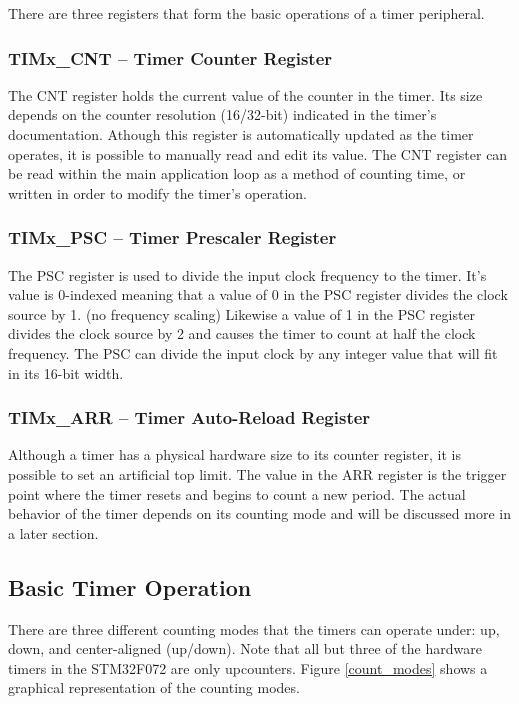 \documentclass[11pt,fleqn]{book} %
\begin{document}
    There are three registers that form the basic operations of a timer peripheral. 
    \subsubsection{TIMx\_CNT -- Timer Counter Register}
    The CNT register holds the current value of the counter in the timer. Its size depends on the counter resolution (16/32-bit) indicated in the timer's documentation. Athough this register is automatically updated as the timer operates, it is possible to manually read and edit its value. The CNT register can be read within the main application loop as a method of counting time, or written in order to modify the timer's operation. 
    \subsubsection{TIMx\_PSC -- Timer Prescaler Register}
    The PSC register is used to divide the input clock frequency to the timer. It's value is 0-indexed meaning that a value of 0 in the PSC register divides the clock source by 1. (no frequency scaling) Likewise a value of 1 in the PSC register divides the clock source by 2 and causes the timer to count at half the clock frequency. The PSC can divide the input clock by any integer value that will fit in its 16-bit width. 
    \subsubsection{TIMx\_ARR -- Timer Auto-Reload Register}
    Although a timer has a physical hardware size to its counter register, it is possible to set an artificial top limit. The value in the ARR register is the trigger point where the timer resets and begins to count a new period. The actual behavior of the timer depends on its counting mode and will be discussed more in a later section. 

    
    \subsection{Basic Timer Operation}
    
    There are three different counting modes that the timers can operate under: up, down, and center-aligned (up/down). Note that all but three of the hardware timers in the STM32F072 are only upcounters. Figure \ref{count_modes} shows a graphical representation of the counting modes. 
    
\end{document}
